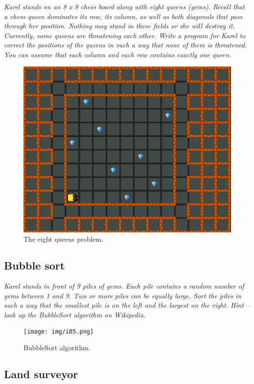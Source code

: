 \noindent
{\em Karel stands on an 8 x 8 chess board along with eight queens (gems). Recall that a chess queen dominates its row, its column, as well as both diagonals that pass through her position. Nothing may stand in these fields or she will destroy it. Currently, some queens are threatening each other. Write a program for Karel to correct the positions of the queens in such a way that none of them is threatened. You can assume that each column and each row contains exactly one queen. }

\begin{figure}[!ht]
\begin{center}
\includegraphics[height=0.4\textwidth]{img/i04.png}
\end{center}
\vspace{-4mm}
\caption{The eight queens problem.}
\label{fig:g14}
\end{figure}

\newpage
\subsection{Bubble sort}

\noindent
{\em Karel stands in front of 9 piles of gems. Each pile contains a random number of gems between 1 and 9. 
Two or more piles can be equally large. Sort the piles in such a way that the smallest pile is on the left 
and the largest on the right. Hint -- look up the BubbleSort algorithm on Wikipedia.}

\begin{figure}[!ht]
\begin{center}
\texttt{[image: img/i05.png]}
\end{center}
\vspace{-4mm}
\caption{BubbleSort algorithm.}
\label{fig:g13}
\end{figure}

\newpage
\subsection{Land surveyor}

